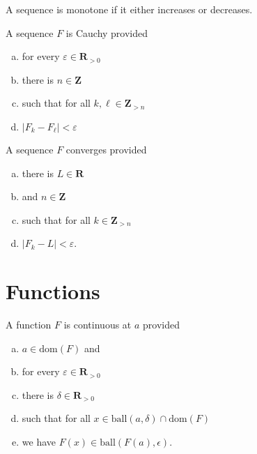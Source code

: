 \documentclass[letterpaper,landscape,9pt,fleqn]{extarticle}
\newcommand{\dom}{\mathrm{dom}}
\newcommand{\reals}{\mathbf{R}}
\newcommand{\ball}{\mathrm{ball}}
\newcommand{\integers}{\mathbf{Z}}
\newenvironment{alphalist}{
  \begin{enumerate}[(a)]
    \addtolength{\itemsep}{-1.0\itemsep}}
  {\end{enumerate}}
\begin{document}
\begin{multicols*}{3}
\begin{description}[\itemsep=0em]
\item[Monotone] A sequence is monotone if it either increases or
decreases.
\item[Cauchy] A sequence $F$ is Cauchy provided
\begin{alphalist}
    \item for every $\varepsilon \in \reals_{>0}$
    \item there is $n \in \integers$
    \item such that for all $k,\ell \in \integers_{>n}$
    \item $|F_k - F_\ell| < \varepsilon$
\end{alphalist}

\item[Converges] A sequence $F$ converges provided
\begin{alphalist}
    \item there is $L \in \reals$
    \item and $n \in \integers$
    \item such that for all $k \in \integers_{>n}$
    \item $|F_k - L | < \varepsilon$.
\end{alphalist}
\end{description}

\section*{Functions}   
\begin{description}[\itemsep=0em]
    \item[Continuous] A function $F$ is continuous at $a$ provided
    \begin{alphalist}
        \item $a \in \dom(F)$ and
        \item for every $\varepsilon \in \reals_{>0}$
        \item there is $\delta \in \reals_{>0}$
        \item such that for all $x \in \ball(a,\delta) \cap \dom(F)$
        \item we have $F(x) \in \ball(F(a), \epsilon)$.
    \end{alphalist}


\end{description}
\end{multicols*}
\end{document}

